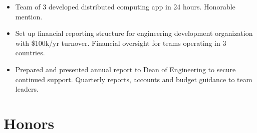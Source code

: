 \documentclass[a4paper, margin]{res}
\begin{document}
\begin{sloppypar}
\begin{resume}
    \begin{itemize}
        \item Team of 3 developed distributed computing app in 24 hours. Honorable mention.
    \end{itemize}



    \begin{itemize}
        \item Set up financial reporting structure for engineering development organization with \$100k/yr turnover. Financial oversight for teams operating in 3 countries.
        \item Prepared and presented annual report to Dean of Engineering to secure continued support. Quarterly reports, accounts and budget guidance to team leaders.
    \end{itemize}


\section{Honors}
 \\
 \\
 \\



\end{resume}
\end{sloppypar}
\end{document}
